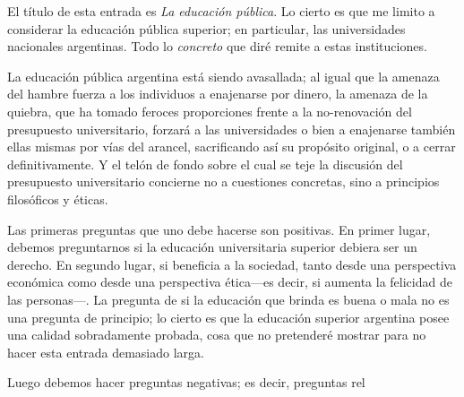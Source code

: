 \documentclass[a4paper, 12pt]{article}
\begin{document}
El título de esta entrada es \textit{La educación pública}. Lo cierto es que me
limito a considerar la educación pública superior; en particular, las
universidades nacionales argentinas. Todo lo \textit{concreto} que diré remite a
estas instituciones. 

La educación pública argentina está siendo avasallada; al igual que la amenaza
del hambre fuerza a los individuos a enajenarse por dinero, la amenaza de la
quiebra, que ha tomado feroces proporciones frente a la no-renovación del
presupuesto universitario, forzará a las universidades o bien a enajenarse
también ellas mismas por vías del arancel, sacrificando así su propósito
original, o a cerrar definitivamente. Y el telón de fondo sobre el cual se teje
la discusión del presupuesto universitario concierne no a cuestiones concretas,
sino a principios filosóficos y éticas. 

Las primeras preguntas que uno debe hacerse son positivas. En primer lugar,
debemos preguntarnos si la educación universitaria superior debiera ser un
derecho. En segundo lugar, si beneficia a la sociedad, tanto desde una
perspectiva económica como desde una perspectiva ética---es decir, si aumenta la
felicidad de las personas---. La pregunta de si la educación que brinda es buena
o mala no es una pregunta de principio; lo cierto es que la educación superior
argentina posee una calidad sobradamente probada, cosa que no pretenderé mostrar
para no hacer esta entrada demasiado larga.

Luego debemos hacer preguntas negativas; es decir, preguntas rel
\end{document}
